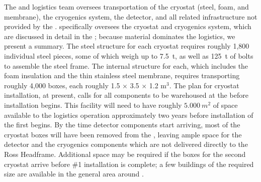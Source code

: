 The  and  logistics team oversees transportation of the cryostat (steel, foam, and membrane), the cryogenics system, the detector, and all related infrastructure not provided by the . 
 specifically oversees the cryostat and cryogenics system, which are  discussed in detail in the  ; because  material dominates the logistics, we present a summary.  
The steel structure for each cryostat requires roughly 1,800 individual steel pieces,  some of which weigh up to \SI{7.5}{t}, as well as \SI{125}{t} of bolts to assemble the steel frame. 
The internal structure for each, which includes the foam insulation and the thin stainless steel membrane, requires transporting roughly 4,000 boxes, 
 each roughly 1.5 $\times$ 3.5 $\times$ 1.2 m$^3$. 
 The plan for cryostat installation, at present, calls for all components to be warehoused at the  before installation begins. 
This facility will need to have roughly $\SI{5,000}{m^2}$ of space available to the logistics operation approximately two years before installation of the first  begins. 
By the time detector components start arriving, most of the cryostat boxes will have been removed from the , leaving ample space for the detector and the cryogenics components which are not delivered directly to the Ross Headframe. 
Additional space may be required if the boxes for the second cryostat arrive before   \#1 installation is complete; a few buildings of the required size are available in the general area around . 

